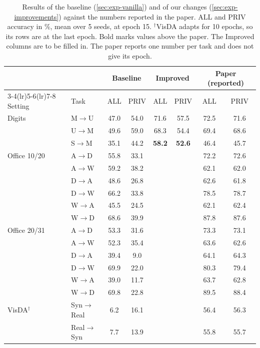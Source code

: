 \begin{table}[t]
  \centering
  \footnotesize
  \setlength{\tabcolsep}{3.5pt}
  \caption{Results of the baseline (\cref{sec:exp-vanilla}) and of our changes (\cref{sec:exp-improvements}) against the numbers reported in the paper. ALL and PRIV accuracy in \%, mean over 5 seeds, at epoch 15. $^\dagger$VisDA adapts for 10 epochs, so its rows are at the last epoch. Bold marks values above the paper. The Improved columns are to be filled in. The paper reports one number per task and does not give its epoch.}
  \label{tab:results}
  \begin{tabular}{@{}llcccccc@{}}
    \toprule
    & & \multicolumn{2}{c}{Baseline} & \multicolumn{2}{c}{Improved} & \multicolumn{2}{c}{Paper (reported)} \\
    \cmidrule(lr){3-4}\cmidrule(lr){5-6}\cmidrule(lr){7-8}
    Setting & Task & ALL & PRIV & ALL & PRIV & ALL & PRIV \\
    \midrule
    Digits & M$\to$U & 47.0 & 54.0 & 71.6 & 57.5 & 72.5 & 71.6 \\
     & U$\to$M & 49.6 & 59.0 & 68.3 & 54.4 & 69.4 & 68.6 \\
     & S$\to$M & 35.1 & 44.2 & \textbf{58.2} & \textbf{52.6} & 46.4 & 45.7 \\
    \midrule
    Office 10/20 & A$\to$D & 55.8 & 33.1 &  &  & 72.2 & 72.6 \\
     & A$\to$W & 59.2 & 38.2 &  &  & 62.1 & 62.0 \\
     & D$\to$A & 48.6 & 26.8 &  &  & 62.6 & 61.8 \\
     & D$\to$W & 66.2 & 33.8 &  &  & 78.5 & 78.7 \\
     & W$\to$A & 45.5 & 24.5 &  &  & 62.1 & 62.4 \\
     & W$\to$D & 68.6 & 39.9 &  &  & 87.8 & 87.6 \\
    \midrule
    Office 20/31 & A$\to$D & 53.3 & 31.6 &  &  & 73.3 & 73.1 \\
     & A$\to$W & 52.3 & 35.4 &  &  & 63.6 & 62.6 \\
     & D$\to$A & 39.4 & 9.0 &  &  & 64.1 & 64.3 \\
     & D$\to$W & 69.9 & 22.0 &  &  & 80.3 & 79.4 \\
     & W$\to$A & 39.0 & 11.7 &  &  & 63.7 & 62.8 \\
     & W$\to$D & 69.8 & 22.8 &  &  & 89.5 & 88.4 \\
    \midrule
    VisDA$^\dagger$ & Syn$\to$Real & 6.2 & 16.1 &  &  & 56.4 & 56.3 \\
     & Real$\to$Syn & 7.7 & 13.9 &  &  & 55.8 & 55.7 \\
    \bottomrule
  \end{tabular}
\end{table}

